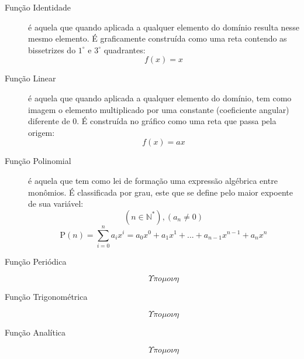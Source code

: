         \begin{description}
            \item[Função Identidade] é aquela que quando aplicada a qualquer elemento do domínio resulta nesse mesmo elemento. É graficamente construída como uma reta contendo as bissetrizes do $1^{\circ}$ e $3^{\circ}$ quadrantes:
            \[ f(x) = x \]
            \begin{center}
            \end{center}
            \item[Função Linear] é aquela que quando aplicada a qualquer elemento do domínio, tem como imagem o elemento multiplicado por uma constante (coeficiente angular) diferente de 0. É construída no gráfico como uma reta que passa pela origem:
            \[ f(x) = ax \]
            \begin{center}
            \end{center}
            \item[Função Polinomial] é aquela que tem como lei de formação uma expressão algébrica entre monômios. É classificada por grau, este que se define pelo maior expoente de sua variável:
            \[ (n \in \mathbb{N}^*), (a_n \neq 0) \]
            \[ \mathrm{P}(n) = \displaystyle\sum_{i=0}^{n} {a_{i}x^{i}} = a_{0}x^{0} + a_{1}x^{1} + ... + a_{n-1}x^{n-1} + a_{n}x^{n} \]
            \item[Função Periódica] \[ \Upsilon \pi o \mu o \nu \eta \]
            \item[Função Trigonométrica] \[ \Upsilon \pi o \mu o \nu \eta \]
            \item[Função Analítica] \[ \Upsilon \pi o \mu o \nu \eta \]
        \end{description}
